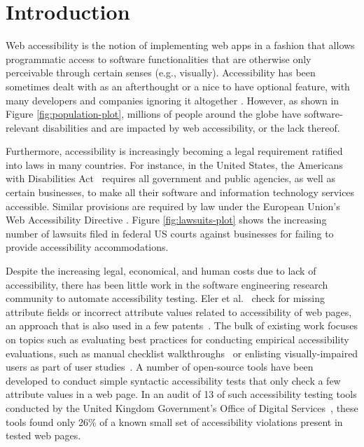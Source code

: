 \section{Introduction}
Web accessibility is the notion of implementing web apps  
in a fashion that allows programmatic access to 
software functionalities that are otherwise only 
perceivable through certain senses (e.g., visually). 
Accessibility has been sometimes dealt with as an 
afterthought or a nice to have optional feature, 
with many developers and companies 
ignoring it altogether \cite{vendome2019can,harper2012web}. 
However, as shown in Figure \ref{fig:population-plot}, millions 
of people around the globe have software-relevant disabilities and are impacted by web accessibility, or the lack thereof. 

Furthermore, accessibility is increasingly becoming a legal 
requirement ratified into laws in many countries.
For instance, in the United States, the Americans with Disabilities Act~\cite{law:ada} 
requires all government and public agencies, as well as certain businesses, 
to make all their software and information technology 
services accessible. 
Similar provisions are required by law under the European
Union's Web Accessibility Directive \cite{law:eu_accessibility}.
Figure \ref{fig:lawsuits-plot} shows the increasing number of lawsuits
filed in federal US courts against businesses for failing to provide 
accessibility accommodations.

Despite the increasing legal, economical, and human costs due to lack of 
accessibility, there has been little work in the 
software engineering research community to automate accessibility testing.
Eler et al.~\cite{eler2018automated} check for missing attribute fields or 
incorrect attribute values related to accessibility of web pages, an approach that is 
also used in a few patents~\cite{sap2019accessibility, breeds2014software}.
The bulk of existing work focuses on topics such as 
evaluating best practices for conducting empirical accessibility evaluations, 
such as manual checklist walkthroughs~\cite{braga2014applying} or enlisting
visually-impaired users as part of user studies~\cite{bayer2006accessibility}.
A number of open-source tools have been developed to conduct simple syntactic accessibility tests 
that only check a few attribute values in a web page. 
In an audit of 13 of such accessibility testing tools conducted by the United Kingdom
Government's Office of Digital Services~\cite{ukgov:audit:2018}, 
these tools found only 26\% of a known small set of accessibility violations
present in tested web pages.

